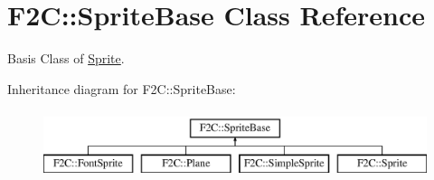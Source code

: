 \hypertarget{class_f2_c_1_1_sprite_base}{
\section{F2C::SpriteBase Class Reference}
\label{class_f2_c_1_1_sprite_base}
}


Basis Class of \hyperlink{class_f2_c_1_1_sprite}{Sprite}.  


Inheritance diagram for F2C::SpriteBase:\begin{figure}[H]
\begin{center}
\leavevmode
\includegraphics[height=2.000000cm]{class_f2_c_1_1_sprite_base}
\end{center}
\end{figure}
